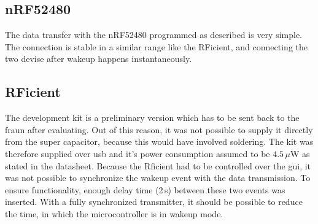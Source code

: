\subsection{nRF52480}
The data transfer with the nRF52480 programmed as described is very simple.
The connection is stable in a similar range like the RFicient, and connecting the two devise after wakeup happens instantaneously.

\subsection{RFicient}
The development kit is a preliminary version which has to be sent back to the \acs{fraun} after evaluating.
Out of this reason, it was not possible to supply it directly from the super capacitor, because this would have involved soldering.
The kit was therefore supplied over \acs{usb} and it's power consumption assumed to be $4.5\,\mu \text{W}$ as stated in the datasheet.
Because the Rficient had to be controlled over the \acs{gui}, it was not possible to synchronize the wakeup event with the data transmission.
To ensure functionality, enough delay time (2\,s) between these two events was inserted.
With a fully synchronized transmitter, it should be possible to reduce the time, in which the microcontroller is in wakeup mode.